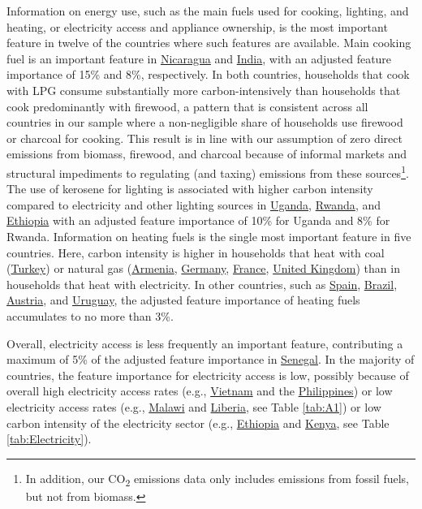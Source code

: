 \documentclass[12pt, a4paper]{article}
\begin{document}
Information on energy use, such as the main fuels used for cooking, lighting, and heating, or electricity access and appliance ownership, is the most important feature in twelve of the countries where such features are available. Main cooking fuel is an important feature in \hyperref[fig:5b_NIC]{Nicaragua} and \hyperref[fig:5b_IND]{India}, with an adjusted feature importance of 15\% and 8\%, respectively. In both countries, households that cook with LPG consume substantially more carbon-intensively than households that cook predominantly with firewood, a pattern that is consistent across all countries in our sample where a non-negligible share of households use firewood or charcoal for cooking. This result is in line with our assumption of zero direct emissions from biomass, firewood, and charcoal because of informal markets and structural impediments to regulating (and taxing) emissions from these sources\footnote{In addition, our CO\textsubscript{2} emissions data only includes emissions from fossil fuels, but not from biomass.}. The use of kerosene for lighting is associated with higher carbon intensity compared to electricity and other lighting sources in \hyperref[fig:5b_UGA]{Uganda}, \hyperref[fig:5b_RWA]{Rwanda}, and \hyperref[fig:5b_ETH]{Ethiopia} with an adjusted feature importance of 10\% for Uganda and 8\% for Rwanda. Information on heating fuels is the single most important feature in five countries. Here, carbon intensity is higher in households that heat with coal (\hyperref[fig:5b_TUR]{Turkey}) or natural gas (\hyperref[fig:5b_ARM]{Armenia}, \hyperref[fig:5b_DEU]{Germany}, \hyperref[fig:5b_FRA]{France}, \hyperref[fig:5b_GBR]{United Kingdom}) than in households that heat with electricity. In other countries, such as  \hyperref[fig:5b_ESP]{Spain}, \hyperref[fig:5b_BRA]{Brazil}, \hyperref[fig:5b_AUT]{Austria}, and \hyperref[fig:5b_URY]{Uruguay}, the adjusted feature importance of heating fuels accumulates to no more than 3\%.

Overall, electricity access is less frequently an important feature, contributing a maximum of 5\% of the adjusted feature importance in \hyperref[fig:5b_SEN]{Senegal}. In the majority of countries, the feature importance for electricity access is low, possibly because of overall high electricity access rates (e.g., \hyperref[fig:5b_VNM]{Vietnam} and the \hyperref[fig:5b_PHL]{Philippines}) or low electricity access rates (e.g., \hyperref[fig:5b_MWI]{Malawi} and \hyperref[fig:5b_LBR]{Liberia}, see Table \ref{tab:A1}) or low carbon intensity of the electricity sector (e.g., \hyperref[fig:5b_ETH]{Ethiopia} and \hyperref[fig:5b_KEN]{Kenya}, see Table \ref{tab:Electricity}).
\end{document}
